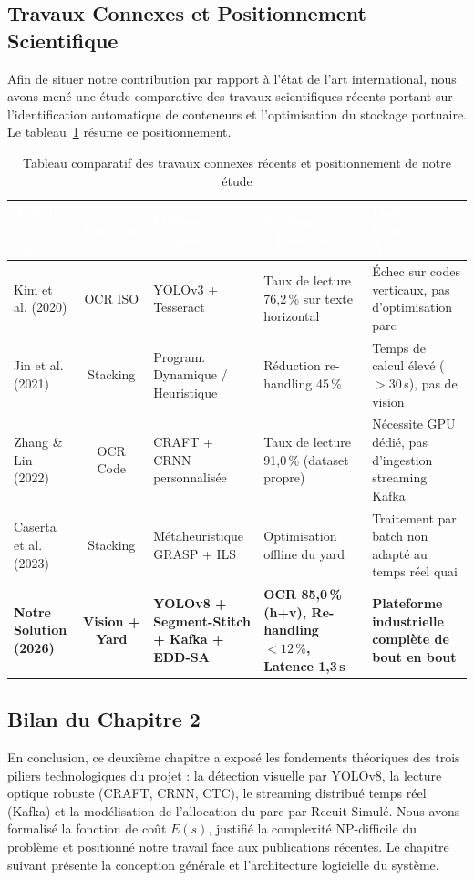 \documentclass[12pt,a4paper]{article}
\begin{document}
\subsection{Travaux Connexes et Positionnement Scientifique}

Afin de situer notre contribution par rapport à l'état de l'art international, nous avons mené une étude comparative des travaux scientifiques récents portant sur l'identification automatique de conteneurs et l'optimisation du stockage portuaire. Le tableau~\ref{tab:related_work} résume ce positionnement.

\begin{table}[H]
\centering
\caption{Tableau comparatif des travaux connexes récents et positionnement de notre étude}
\begin{tabular}{|p{3cm}|c|p{3.5cm}|p{3.5cm}|p{3cm}|}
\hline
\rowcolor{TableHeader}\textcolor{white}{\textbf{Auteurs \& Année}} & \textcolor{white}{\textbf{Domaine}} & \textcolor{white}{\textbf{Méthode proposée}} & \textcolor{white}{\textbf{Performances / Résultats}} & \textcolor{white}{\textbf{Limites vs Notre Approche}} \\ \hline
Kim et al. (2020) \cite{Kim2020ISO} & OCR ISO & YOLOv3 + Tesseract & Taux de lecture 76,2\,\% sur texte horizontal & Échec sur codes verticaux, pas d'optimisation parc \\ \hline
Jin et al. (2021) \cite{Jin2021CRP} & Stacking & Program. Dynamique / Heuristique & Réduction re-handling 45\,\% & Temps de calcul élevé ($> 30$\,s), pas de vision \\ \hline
Zhang \& Lin (2022) \cite{Zhang2022OCR} & OCR Code & CRAFT + CRNN personnalisée & Taux de lecture 91,0\,\% (dataset propre) & Nécessite GPU dédié, pas d'ingestion streaming Kafka \\ \hline
Caserta et al. (2023) \cite{Caserta2023YSP} & Stacking & Métaheuristique GRASP + ILS & Optimisation offline du yard & Traitement par batch non adapté au temps réel quai \\ \hline
\textbf{Notre Solution (2026)} & \textbf{Vision + Yard} & \textbf{YOLOv8 + Segment-Stitch + Kafka + EDD-SA} & \textbf{OCR 85,0\,\% (h+v), Re-handling $< 12\,\%$, Latence 1,3\,s} & \textbf{Plateforme industrielle complète de bout en bout} \\ \hline
\end{tabular}
\label{tab:related_work}
\end{table}

\subsection{Bilan du Chapitre 2}
En conclusion, ce deuxième chapitre a exposé les fondements théoriques des trois piliers technologiques du projet : la détection visuelle par YOLOv8, la lecture optique robuste (CRAFT, CRNN, CTC), le streaming distribué temps réel (Kafka) et la modélisation de l'allocation du parc par Recuit Simulé. Nous avons formalisé la fonction de coût $E(s)$, justifié la complexité NP-difficile du problème et positionné notre travail face aux publications récentes. Le chapitre suivant présente la conception générale et l'architecture logicielle du système.
\end{document}
